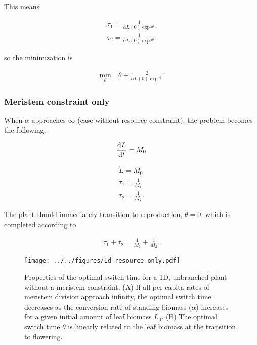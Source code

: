 \documentclass[12pt, oneside]{article}   	%
\begin{document}
This means

\begin{align}
\tau_1 = \frac{1}{\alpha L(0) \exp^{\alpha \theta}} \nonumber \\ 
\tau_2 = \frac{1}{\alpha L(0) \exp^{\alpha \theta}} \nonumber
\end{align}

so the minimization is 

\begin{align}
\min_{\theta} & \ \theta + \frac{2}{\alpha L(0) \exp^{\alpha \theta}}  \nonumber
\end{align}

\clearpage
\newpage

\subsubsection{Meristem constraint only}
When $\alpha$ approaches $\infty$ (case without resource constraint), the problem becomes the following. 

\begin{align}
\dv{L}{t} = M_0
\end{align}

\begin{align}
\dot{L} =  M_0 \nonumber \\
\tau_1 = \frac{1}{M_1} \nonumber \\ 
\tau_2 = \frac{1}{M_2}. \nonumber
\end{align}

The plant should immediately transition to reproduction, $\theta=0$, which is completed according to

\begin{align}
\tau_1 + \tau_2 = \frac{1}{M_1} + \frac{1}{M_2}.  \nonumber
\end{align}

\clearpage
\newpage

\begin{figure}[!h]
       \texttt{[image: ../../figures/1d-resource-only.pdf]}  
    \caption{ Properties of the optimal switch time for a 1D, unbranched plant without a meristem constraint. (A) If all per-capita rates of meristem division approach infinity, the optimal switch time decreases as the conversion rate of standing biomass ($\alpha$) increases  for a given initial amount of leaf biomass $L_0$. (B) The optimal switch time $\theta$ is linearly related to the leaf biomass at the transition to flowering.   }
 \label{fig:figure-x}
\end{figure}
\end{document}
